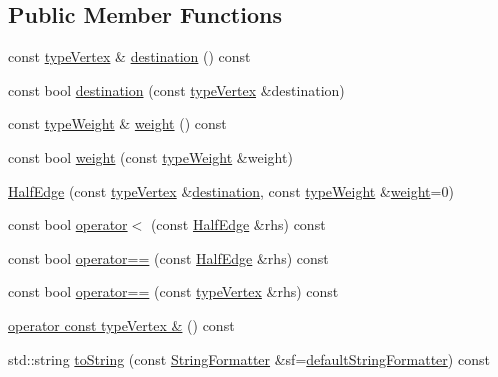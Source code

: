 \subsection*{Public Member Functions}
\begin{DoxyCompactItemize}
\item 
const \hyperlink{edge_8h_a5fbd20c46956d479cb10afc9855223f6}{type\+Vertex} \& \hyperlink{classHalfEdge_a98c0fb1c54506abbd3c0ac4a1264dac1}{destination} () const
\item 
const bool \hyperlink{classHalfEdge_ac9f0f75077407355bde248e083d98161}{destination} (const \hyperlink{edge_8h_a5fbd20c46956d479cb10afc9855223f6}{type\+Vertex} \&destination)
\item 
const \hyperlink{edge_8h_a2e7ea3be891ac8b52f749ec73fee6dd2}{type\+Weight} \& \hyperlink{classHalfEdge_a89cc13d21ae44a9d9c2ba95f89576090}{weight} () const
\item 
const bool \hyperlink{classHalfEdge_ac1a67d4cdc5cd8ff286f7f27d691323d}{weight} (const \hyperlink{edge_8h_a2e7ea3be891ac8b52f749ec73fee6dd2}{type\+Weight} \&weight)
\item 
\hyperlink{classHalfEdge_a110763f118d6b5936bb3fe945a3ae226}{Half\+Edge} (const \hyperlink{edge_8h_a5fbd20c46956d479cb10afc9855223f6}{type\+Vertex} \&\hyperlink{classHalfEdge_a98c0fb1c54506abbd3c0ac4a1264dac1}{destination}, const \hyperlink{edge_8h_a2e7ea3be891ac8b52f749ec73fee6dd2}{type\+Weight} \&\hyperlink{classHalfEdge_a89cc13d21ae44a9d9c2ba95f89576090}{weight}=0)
\item 
const bool \hyperlink{classHalfEdge_a29e0306074978afc471a058273cb5162}{operator$<$} (const \hyperlink{classHalfEdge}{Half\+Edge} \&rhs) const
\item 
const bool \hyperlink{classHalfEdge_a23ac17482f740af513d141c77361cd37}{operator==} (const \hyperlink{classHalfEdge}{Half\+Edge} \&rhs) const
\item 
const bool \hyperlink{classHalfEdge_a3bdd3ac1c21afdb400d8afbc0047d3bb}{operator==} (const \hyperlink{edge_8h_a5fbd20c46956d479cb10afc9855223f6}{type\+Vertex} \&rhs) const
\item 
\hyperlink{classHalfEdge_a68ec8852ea749e21798e7d65deff483e}{operator const type\+Vertex \&} () const
\item 
std\+::string \hyperlink{classHalfEdge_a404d99fef10c73f149fec5f87ca18958}{to\+String} (const \hyperlink{classStringFormatter}{String\+Formatter} \&sf=\hyperlink{stringFormatter_8h_abf1349c8e24162d0134072aff288f2a2}{default\+String\+Formatter}) const
\end{DoxyCompactItemize}
